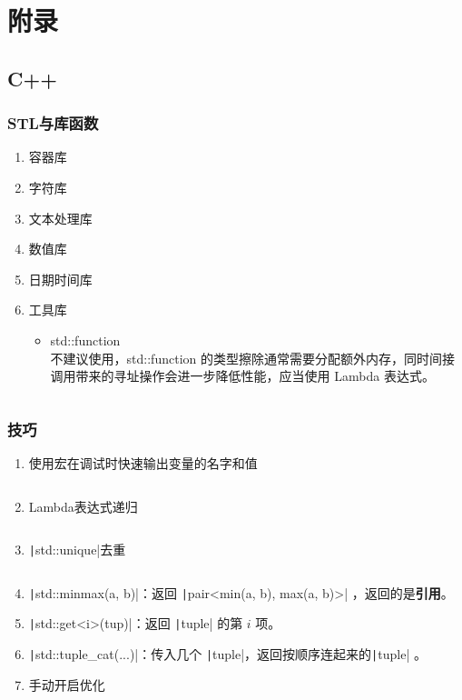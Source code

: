 \documentclass[a4paper, twoside]{article}
\begin{document}
\newpage
\section{附录}
\subsection{C++}
    \subsubsection{STL与库函数}
    \begin{enumerate}
        \item 容器库
        \item 字符库
        \item 文本处理库
        \item 数值库
        \item 日期时间库
        \item 工具库
        \begin{itemize}
            \item std::function\\
            不建议使用，std::function 的类型擦除通常需要分配额外内存，同时间接调用带来的寻址操作会进一步降低性能，应当使用 Lambda 表达式。
            \inputminted{cpp}{../src/附录/C++/std::function.cpp}
        \end{itemize}
    \end{enumerate}
    \subsubsection{技巧}
    \begin{enumerate}
        \item 使用宏在调试时快速输出变量的名字和值
        \inputminted{cpp}{../src/附录/C++/debug宏.cpp}
        \item Lambda表达式递归
        \inputminted{cpp}{../src/附录/C++/Lambda表达式递归.cpp}
        \item \texttt|std::unique|去重
        \inputminted{cpp}{../src/附录/C++/std::unique去重.cpp}
        \item \texttt|std::minmax(a, b)|：返回 \texttt|pair<min(a, b), max(a, b)>| ，返回的是\textbf{引用}。
        \item \texttt|std::get<i>(tup)|：返回 \texttt|tuple| 的第 $i$ 项。
        \item \texttt|std::tuple_cat(...)|：传入几个 \texttt|tuple|，返回按顺序连起来的\texttt|tuple| 。
        \item 手动开启优化
        \inputminted{cpp}{../src/附录/C++/手动开启优化.cpp}

    \end{enumerate}
    
\end{document}
